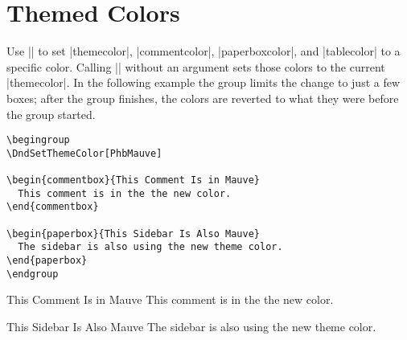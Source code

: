 \documentclass[letterpaper,twocolumn,openany]{dndbook}
\begin{document}
\section{Themed Colors}
Use |\DndSetThemeColor[<color>]| to set |themecolor|, |commentcolor|, |paperboxcolor|, and |tablecolor| to a specific color. Calling |\DndSetThemeColor| without an argument sets those colors to the current |themecolor|. In the following example the group limits the change to just a few boxes; after the group finishes, the colors are reverted to what they were before the group started.

\begin{lstlisting}
\begingroup
\DndSetThemeColor[PhbMauve]

\begin{commentbox}{This Comment Is in Mauve}
  This comment is in the the new color.
\end{commentbox}

\begin{paperbox}{This Sidebar Is Also Mauve}
  The sidebar is also using the new theme color.
\end{paperbox}
\endgroup
\end{lstlisting}

\begingroup
\DndSetThemeColor[PhbMauve]

\begin{commentbox}{This Comment Is in Mauve}
  This comment is in the the new color.
\end{commentbox}

\begin{paperbox}{This Sidebar Is Also Mauve}
  The sidebar is also using the new theme color.
\end{paperbox}

\endgroup
\end{document}
